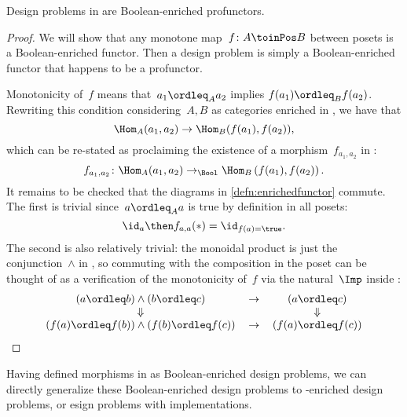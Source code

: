\begin{proposition}
    Design problems in \DP are Boolean-enriched profunctors.
\end{proposition}
\begin{proof}
    We will show that any monotone map~$f\colon A \toinPos B$ between posets is a Boolean-enriched functor. Then a design problem is simply a Boolean-enriched functor that happens to be a profunctor.

    Monotonicity of~$f$ means that~$a_1 \ordleq_A a_2$ implies $f(a_1) \ordleq_B f(a_2)$. Rewriting this condition considering~$A, B$ as categories enriched in \Bool, we have that
    \begin{equation*}
        \Hom_A(a_1, a_2) \to \Hom_B(f(a_1), f(a_2)),
    \end{equation*}
    which can be re-stated as proclaiming the existence of a morphism~$f_{a_1, a_2}$ in \Bool:
    \begin{equation*}
        f_{a_1, a_2} \colon \Hom_A(a_1, a_2) \to_{\Bool} \Hom_B\left(f(a_1), f(a_2)\right).
    \end{equation*}
    It remains to be checked that the diagrams in \cref{defn:enrichedfunctor} commute. The first is trivial since~$a \ordleq_A a$ is true by definition in all posets:
    \begin{equation*}
        \id_{a} \then f_{a,a} (\ast) = \id_{f(a) = \true}.
    \end{equation*}
    The second is also relatively trivial: the monoidal product is just the conjunction~$\wedge$ in \Bool, so commuting with the composition in the poset can be thought of as a verification of the monotonicity of~$f$ via the natural~$\Imp$ inside \Bool:
    \begin{equation*}
        \begin{tabular}{ccc}
            $(a \ordleq b) \wedge (b \ordleq c)$             & $\to$ & $(a \ordleq c)$       \\
            $\Downarrow$                                     &       & $\Downarrow$          \\
            $(f(a) \ordleq f(b)) \wedge (f(b) \ordleq f(c))$ & $\to$ & $(f(a) \ordleq f(c))$
        \end{tabular}
    \end{equation*}
\end{proof}

Having defined morphisms in \DP as Boolean-enriched design problems, we can directly generalize these Boolean-enriched design problems to \Set-enriched design problems, or esign problems with implementations.

